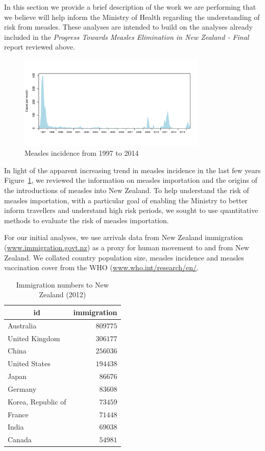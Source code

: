 \documentclass{article}
\begin{document}
In this section we provide a brief description of the work we are performing that we believe will help inform the Ministry of Health regarding the understanding of risk from measles. These analyses are intended to build on the analyses already included in the \emph {Progress Towards Measles Elimination in New Zealand - Final} report reviewed above.

\begin{figure}
     \centering
     \includegraphics[width=0.8\textwidth]{incidence_1997_2014.pdf}
     \caption{Measles incidence from 1997 to 2014}
     \label{fig:incidence1997}
\end{figure}

In light of the apparent increasing trend in measles incidence in the last few years Figure~\ref{fig:incidence1997}, we reviewed the information on measles importation and the origins of the introductions of measles into New Zealand. To help understand the risk of measles importation, with a particular goal of enabling the Ministry to better inform travellers and understand high risk periods, we sought to use quantitative methods to evaluate the risk of measles importation. 

For our initial analyses, we use arrivals data from New Zealand immigration (\href{http://www.immigration.govt.nz/}{www.immigration.govt.nz}) as a proxy for human movement to and from New Zealand. We collated country population size, measles incidence and measles vaccination cover from the WHO (\href{http://www.who.int/research/en/}{www.who.int/research/en/}.


\begin{table}
\caption{Immigration numbers to New Zealand (2012)}
\begin{center}
\begin{tabular}{lr}
\hline\hline
\multicolumn{1}{c}{id}&\multicolumn{1}{c}{immigration}\tabularnewline
\hline
Australia&$809775$\tabularnewline
United Kingdom&$306177$\tabularnewline
China&$256036$\tabularnewline
United States&$194438$\tabularnewline
Japan&$ 86676$\tabularnewline
Germany&$ 83608$\tabularnewline
Korea, Republic of&$ 73459$\tabularnewline
France&$ 71448$\tabularnewline
India&$ 69038$\tabularnewline
Canada&$ 54981$\tabularnewline
\hline
\end{tabular}\end{center}\label{table:immigration12}
\end{table}
\end{document}

